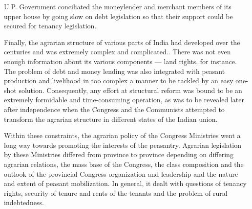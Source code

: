 U.P. Government conciliated the moneylender and merchant members of its upper house by going slow on debt legislation so that their support could be secured for tenancy legislation. 

Finally, the agrarian structure of various parts of India had developed over the centuries and was extremely complex and complicated.. There was not even enough information about its various components --- land rights, for instance. The problem of debt and money lending was also integrated with peasant production and livelihood in too complex a manner to be tackled by an easy one-shot solution. Consequently, any effort at structural reform was bound to be an extremely formidable and time-consuming operation, as was to be revealed later after independence when the Congress and the Communists attempted to transform the agrarian structure in different states of the Indian union. 

Within these constraints, the agrarian policy of the Congress Ministries went a long way towards promoting the interests of the peasantry. Agrarian legislation by these Ministries differed from province to province depending on differing agrarian relations, the mass base of the Congress, the class composition and the outlook of the provincial Congress organization and leadership and the nature and extent of peasant mobilization. In general, it dealt with questions of tenancy rights, security of tenure and rents of the tenants and the problem of rural indebtedness. 

